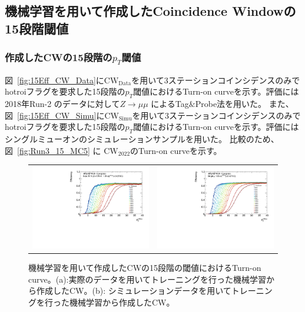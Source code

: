 \newpage

\subsection{機械学習を用いて作成したCoincidence Windowの15段階閾値}
\subsubsection{作成したCWの15段階の$p_T$閾値}
図~\ref{fig:15Eff_CW_Data}に$\mathrm{CW_{Data}}$を用いて3ステーションコインシデンスのみでhotroiフラグを要求した15段階の$p_T$閾値におけるTurn-on curveを示す。評価には2018年Run-2 のデータに対して$Z\rightarrow \mu\mu$ によるTag$\&$Probe法を用いた。
また、図~\ref{fig:15Eff_CW_Simu}に$\mathrm{CW_{Simu}}$を用いて3ステーションコインシデンスのみでhotroiフラグを要求した15段階の$p_T$閾値におけるTurn-on curveを示す。評価にはシングルミューオンのシミュレーションサンプルを用いた。
比較のため、図~\ref{fig:Run3_15_MC5} に $\mathrm{CW_{2022}}$のTurn-on curveを示す。

\begin{figure}
    \begin{tabular}{cc}
    \begin{minipage}[b]{0.45\hsize}
        \includegraphics[clip, width=7cm]{fig/5/15_v06_Data.pdf}
        \subcaption{}
        \label{fig:15Eff_CW_Data}
    \end{minipage}&
    \begin{minipage}[b]{0.45\hsize}
        \includegraphics[clip, width=7cm]{fig/5/15_MC_MC.pdf}
        \subcaption{}
        \label{fig:15Eff_CW_Simu}
    \end{minipage}
    \end{tabular}
    \caption{機械学習を用いて作成したCWの15段階の閾値におけるTurn-on curve。(a):実際のデータを用いてトレーニングを行った機械学習から作成したCW。(b): シミュレーションデータを用いてトレーニングを行った機械学習から作成したCW。}
    \label{}
\end{figure}

